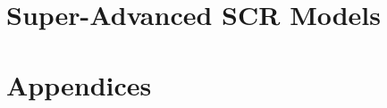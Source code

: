 \documentclass{book}
\begin{document}





\part{Super-Advanced SCR Models}










\part{Appendices}









\end{document}
